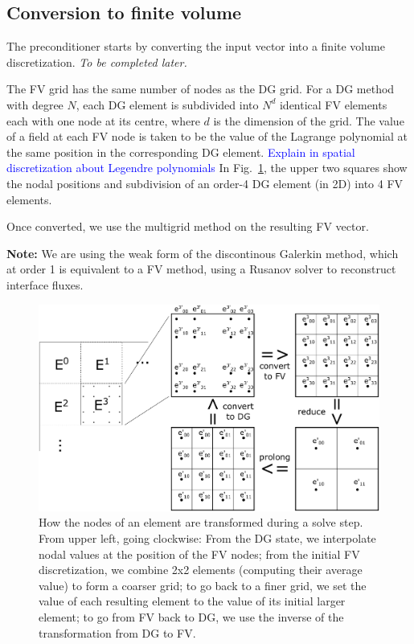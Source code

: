 \documentclass{article}
\newcommand{\todo}[1]{\textcolor{blue}{#1}}
\begin{document}
\subsection{Conversion to finite volume}\label{sec:finite_volume}

The \fgmres{} preconditioner starts by converting the input vector into a finite volume discretization. \emph{To be completed later.}

The FV grid has the same number of nodes as the DG grid.
For a DG method with degree $N$, each DG element is subdivided into $N^d$ identical
FV elements each with one node at its centre, where $d$ is the dimension of the grid. 
The value of a field at each FV node is taken to be the value of the Lagrange 
polynomial at the same position in the corresponding DG element.
\todo{Explain in spatial discretization about Legendre polynomials}
In Fig.~\ref{fig:elem_transform_cycle}, the upper two squares show the nodal positions
and subdivision of an order-4 DG element (in 2D) into 4 FV elements.

Once converted, we use the multigrid method on the resulting FV vector.

\textbf{Note:} We are using the weak form of the discontinous Galerkin method,
which at order 1 is equivalent to a FV method, using a Rusanov solver to reconstruct interface fluxes.



\begin{figure}
    \centering
    \includegraphics[width=0.8\linewidth]{img/elem_organisation}
    \caption{How the nodes of an element are transformed during a solve step.
        From upper left, going clockwise: From the DG state, we interpolate nodal
        values at the position of the FV nodes;
        from the initial FV discretization, we combine 2x2 elements (computing their 
        average value) to form a coarser grid;
        to go back to a finer grid, we set the value of each resulting element to 
        the value of its initial larger element;
        to go from FV back to DG, we use the inverse of the transformation from DG 
        to FV.
        }
    \label{fig:elem_transform_cycle}
\end{figure}
\end{document}
